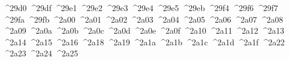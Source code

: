 {  ^^^^29d0%
  ^^^^29df%
  ^^^^29e1%
  ^^^^29e2%
  ^^^^29e3%
  ^^^^29e4%
  ^^^^29e5%
  ^^^^29eb%
  ^^^^29f4%
  ^^^^29f6%
  ^^^^29f7%
  ^^^^29fa%
  ^^^^29fb%
  ^^^^2a00%
  ^^^^2a01%
  ^^^^2a02%
  ^^^^2a03%
  ^^^^2a04%
  ^^^^2a05%
  ^^^^2a06%
  ^^^^2a07%
  ^^^^2a08%
  ^^^^2a09%
  ^^^^2a0a%
  ^^^^2a0b%
  ^^^^2a0c%
  ^^^^2a0d%
  ^^^^2a0e%
  ^^^^2a0f%
  ^^^^2a10%
  ^^^^2a11%
  ^^^^2a12%
  ^^^^2a13%
  ^^^^2a14%
  ^^^^2a15%
  ^^^^2a16%
  ^^^^2a18%
  ^^^^2a19%
  ^^^^2a1a%
  ^^^^2a1b%
  ^^^^2a1c%
  ^^^^2a1d%
  ^^^^2a1f%
  ^^^^2a22%
  ^^^^2a23%
  ^^^^2a24%
  ^^^^2a25%
}
